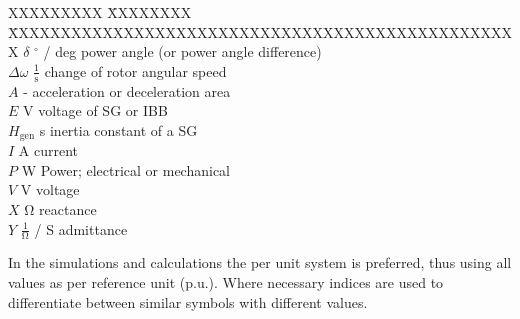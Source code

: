 \begin{tabbing}
    XXXXXXXXX \= XXXXXXXX \= XXXXXXXXXXXXXXXXXXXXXXXXXXXXXXXXXXXXXXXXXXXXXXXXX \kill
    $\delta$            \> $^\circ$ / deg                   \> power angle (or power angle difference) \\
    $\Delta\omega$      \> $\mathrm{\frac{1}{s}}$           \> change of rotor angular speed \\
    $A$                 \> -                                \> acceleration or deceleration area \\
    $E$                 \> V                                \> voltage of \acs{SG} or \acs{IBB} \\
    $H_\mathrm{gen}$    \> s                                \> inertia constant of a \acf{SG} \\
    $I$                 \> A                                \> current \\
    $P$                 \> W                                \> Power; electrical or mechanical \\
    $V$                 \> V                                \> voltage \\
    $X$                 \> $\mathrm{\Omega}$                \> reactance \\
    $Y$                 \> $\mathrm{\frac{1}{\Omega}}$ / S  \> admittance \\
\end{tabbing}

In the simulations and calculations the per unit system is preferred, thus using all values as per reference unit ($\mathrm{p.u.}$). Where necessary indices are used to differentiate between similar symbols with different values.